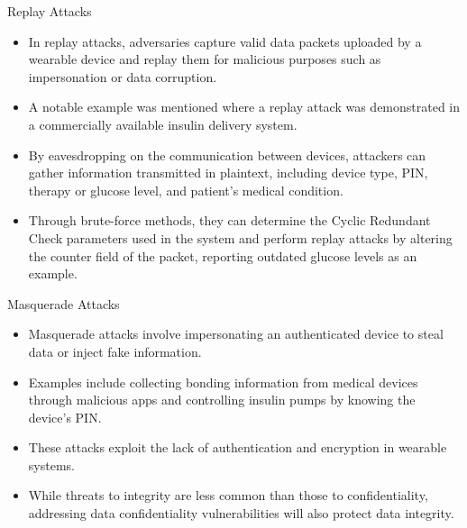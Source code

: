 \documentclass[ucs,9pt]{beamer}
\begin{document}
\begin{frame}{Replay Attacks}
	\begin{itemize}
		\item In replay attacks, adversaries capture valid data packets uploaded by a wearable device and replay them for malicious purposes such as impersonation or data corruption. 
		\item A notable example was mentioned where  a replay attack was demonstrated in a commercially available insulin delivery system.
		\item By eavesdropping on the communication between devices, attackers can gather information transmitted in plaintext, including device type, PIN, therapy or glucose level, and patient's medical condition. 
		\item Through brute-force methods, they can determine the Cyclic Redundant Check parameters used in the system and perform replay attacks by altering the counter field of the packet, reporting outdated glucose levels as an example.
	\end{itemize}
\end{frame}

\begin{frame}{Masquerade Attacks}
	\begin{itemize}
		\item Masquerade attacks involve impersonating an authenticated device to steal data or inject fake information. 
		\item Examples include collecting bonding information from medical devices through malicious apps and controlling insulin pumps by knowing the device's PIN.
		\item  These attacks exploit the lack of authentication and encryption in wearable systems. 
		\item While threats to integrity are less common than those to confidentiality, addressing data confidentiality vulnerabilities will also protect data integrity.
	\end{itemize}
\end{frame}
\end{document}
